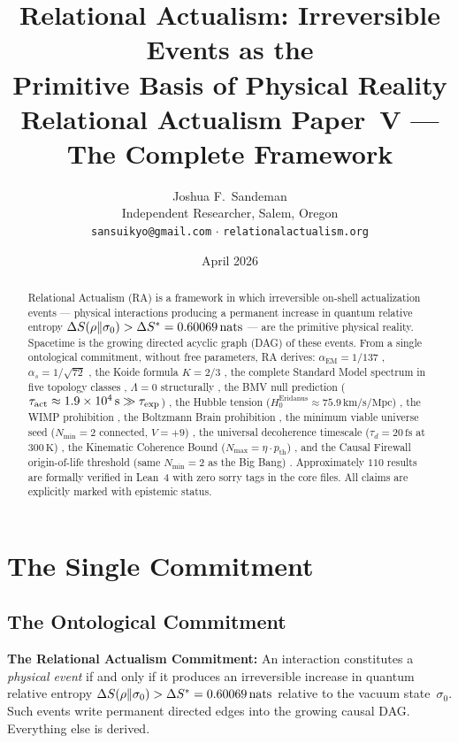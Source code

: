 \documentclass[12pt,a4paper]{article}
\title{\textbf{Relational Actualism: Irreversible Events as the\\
Primitive Basis of Physical Reality}\\[0.4em]
\large\normalfont Relational Actualism Paper~V — The Complete Framework}
\author{Joshua F.~Sandeman\\[0.3em]
\small Independent Researcher, Salem, Oregon\\
\small \texttt{sansuikyo@gmail.com} $\cdot$ \texttt{relationalactualism.org}}
\date{April 2026}
\begin{document}
\maketitle
\begin{abstract}
Relational Actualism (RA) is a framework in which irreversible on-shell actualization events --- physical interactions producing a permanent increase in quantum relative entropy $\Delta S(\rho\|\sigma_0) > \Delta S^* = 0.60069\,\mathrm{nats}$ --- are the primitive physical reality.  Spacetime is the growing directed acyclic graph (DAG) of these events.  From a single ontological commitment, without free parameters, RA derives: $\alpha_{\mathrm{EM}}=1/137$ \statusLV, $\alpha_s=1/\sqrt{72}$ \statusCV, the Koide formula $K=2/3$ \statusLV, the complete Standard Model spectrum in five topology classes \statusLV, $\Lambda=0$ structurally \statusDR, the BMV null prediction ($\tau_{\mathrm{act}} \approx 1.9\times10^4\,\mathrm{s} \gg \tau_{\mathrm{exp}}$) \statusDR, the Hubble tension ($H_0^{\mathrm{Eridanus}}\approx75.9\,\mathrm{km/s/Mpc}$) \statusCV, the WIMP prohibition \statusAR, the Boltzmann Brain prohibition \statusDR, the minimum viable universe seed ($N_{\min}=2$ connected, $V=+9$) \statusDR, the universal decoherence timescale ($\tau_d=20\,\mathrm{fs}$ at $300\,\mathrm{K}$) \statusDR, the Kinematic Coherence Bound ($N_{\max}=\eta\cdot p_{\mathrm{th}}$) \statusLV, and the Causal Firewall origin-of-life threshold (same $N_{\min}=2$ as the Big Bang) \statusDR.  Approximately $110$ results are formally verified in Lean~4 with zero sorry tags in the core files.  All claims are explicitly marked with epistemic status.
\end{abstract}

\tableofcontents

\section{The Single Commitment}

\subsection{The Ontological Commitment}

\begin{mdframed}[linecolor=cv_blue!60,backgroundcolor=cv_blue!5,linewidth=1.5pt]
\textbf{The Relational Actualism Commitment:} An interaction constitutes a \emph{physical event} if and only if it produces an irreversible increase in quantum relative entropy $\Delta S(\rho\|\sigma_0) > \Delta S^* = 0.60069\,\mathrm{nats}$ relative to the vacuum state~$\sigma_0$.  Such events write permanent directed edges into the growing causal DAG.  Everything else is derived.
\end{mdframed}
\end{document}

